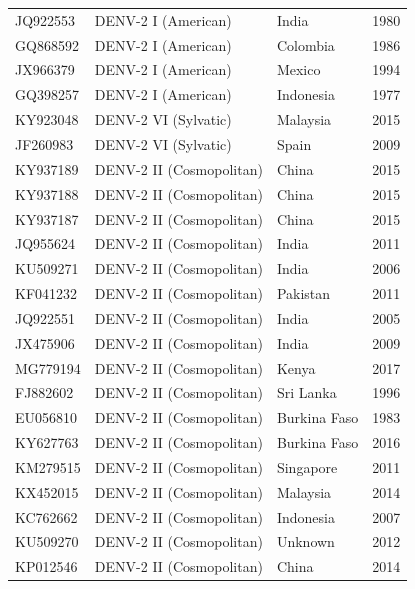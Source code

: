\begin{longtable}{@{}llll@{}}
JQ922553 & DENV-2 I (American)        & India        & 1980            \\
GQ868592 & DENV-2 I (American)        & Colombia     & 1986            \\
JX966379 & DENV-2 I (American)        & Mexico       & 1994            \\
GQ398257 & DENV-2 I (American)        & Indonesia    & 1977            \\
KY923048 & DENV-2 VI (Sylvatic)       & Malaysia     & 2015            \\
JF260983 & DENV-2 VI (Sylvatic)       & Spain        & 2009            \\
KY937189 & DENV-2 II (Cosmopolitan)   & China        & 2015            \\
KY937188 & DENV-2 II (Cosmopolitan)   & China        & 2015            \\
KY937187 & DENV-2 II (Cosmopolitan)   & China        & 2015            \\
JQ955624 & DENV-2 II (Cosmopolitan)   & India        & 2011            \\
KU509271 & DENV-2 II (Cosmopolitan)   & India        & 2006            \\
KF041232 & DENV-2 II (Cosmopolitan)   & Pakistan     & 2011            \\
JQ922551 & DENV-2 II (Cosmopolitan)   & India        & 2005            \\
JX475906 & DENV-2 II (Cosmopolitan)   & India        & 2009            \\
MG779194 & DENV-2 II (Cosmopolitan)   & Kenya        & 2017            \\
FJ882602 & DENV-2 II (Cosmopolitan)   & Sri Lanka    & 1996            \\
EU056810 & DENV-2 II (Cosmopolitan)   & Burkina Faso & 1983            \\
KY627763 & DENV-2 II (Cosmopolitan)   & Burkina Faso & 2016            \\
KM279515 & DENV-2 II (Cosmopolitan)   & Singapore    & 2011            \\
KX452015 & DENV-2 II (Cosmopolitan)   & Malaysia     & 2014            \\
KC762662 & DENV-2 II (Cosmopolitan)   & Indonesia    & 2007            \\
KU509270 & DENV-2 II (Cosmopolitan)   & Unknown      & 2012            \\
KP012546 & DENV-2 II (Cosmopolitan)   & China        & 2014            \\

\end{longtable}

